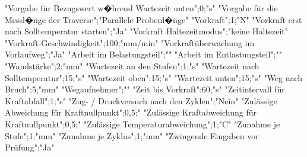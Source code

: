 "Vorgabe für Bezugswert w�hrend Wartezeit unten";0;"s"
"Vorgabe für die Messl�nge der Traverse";"Parallele Probenl�nge"
"Vorkraft";1;"N"
"Vorkraft erst nach Solltemperatur starten";"Ja"
"Vorkraft Haltezeitmodus";"keine Haltezeit"
"Vorkraft-Geschwindigkeit";100;"mm/min"
"Vorkraftüberwachung im Vorlaufweg";"Ja"
"Arbeit im Belastungsteil";""
"Arbeit im Entlastungsteil";""
"Wandstärke";2;"mm"
"Wartezeit an den Stufen";1;"s"
"Wartezeit nach Solltemperatur";15;"s"
"Wartezeit oben";15;"s"
"Wartezeit unten";15;"s"
"Weg nach Bruch";5;"mm"
"Wegaufnehmer";""
"Zeit bis Vorkraft";60;"s"
"Zeitintervall für Kraftabfall";1;"s"
"Zug- / Druckversuch nach den Zyklen";"Nein"
"Zulässige Abweichung für Kraftnullpunkt";0,5;"%
"Zulässige Kraftabweichung für Kraftnullpunkt";0,5;"%
"Zulässige Temperaturabweichung";1;"C"
"Zunahme je Stufe";1;"mm"
"Zunahme je Zyklus";1;"mm"
"Zwingende Eingaben vor Prüfung";"Ja"
